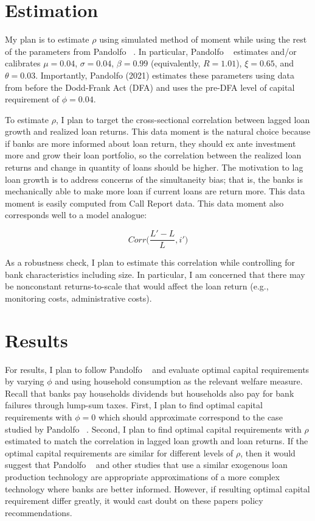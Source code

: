 \documentclass[12pt]{article}
\begin{document}
\section{Estimation}

My plan is to estimate $\rho$ using simulated method of moment while using the rest of the parameters from Pandolfo ~\cite{pandolfo_2021}.  In particular, Pandolfo ~\cite{pandolfo_2021} estimates and/or calibrates $\mu = 0.04$, $\sigma = 0.04$, $\beta = 0.99$ (equivalently, $R = 1.01$), $\xi = 0.65$, and $\theta = 0.03$. Importantly, Pandolfo (2021) estimates these parameters using data from before the Dodd-Frank Act (DFA) and uses the pre-DFA level of capital requirement of $\phi = 0.04$.

\bigskip

To estimate $\rho$, I plan to target the cross-sectional correlation between lagged loan growth and realized loan returns. This data moment is the natural choice because if banks are more informed about loan return, they should ex ante investment more and grow their loan portfolio, so the correlation between the realized loan returns and change in quantity of loans should be higher.  The motivation to lag loan growth is to address concerns of the simultaneity bias; that is, the banks is mechanically able to make more loan if current loans are return more. This data moment is easily computed from Call Report data.  This data moment also corresponds well to a model analogue:

$$
Corr \Bigg(\frac{L' - L}{L}, i' \Bigg)
$$

As a robustness check, I plan to estimate this correlation while controlling for bank characteristics including size. In particular, I am concerned that there may be nonconstant returns-to-scale that would affect the loan return (e.g., monitoring costs, administrative costs).

\section{Results}

For results, I plan to follow Pandolfo ~\cite{pandolfo_2021} and evaluate optimal capital requirements by varying $\phi$ and using household consumption as the relevant welfare measure.  Recall that banks pay households dividends but households also pay for bank failures through lump-sum taxes.  First, I plan to find optimal capital requirements with $\phi = 0$ which should approximate correspond to the case studied by Pandolfo ~\cite{pandolfo_2021}.  Second, I plan to find optimal capital requirements with $\rho$ estimated to match the correlation in lagged loan growth and loan returns. If the optimal capital requirements are similar for different levels of $\rho$, then it would suggest that Pandolfo ~\cite{pandolfo_2021} and other studies that use a similar exogenous loan production technology are appropriate approximations of a more complex technology where banks are better informed.  However, if resulting optimal capital requirement differ greatly, it would cast doubt on these papers policy recommendations.

\pagebreak

{}

\end{document}
